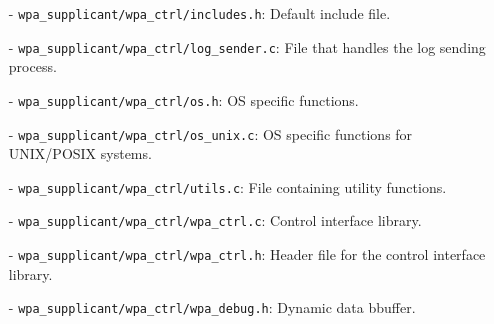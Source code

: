 \begin{itemize}
\item[-] \texttt{wpa\_supplicant/wpa\_ctrl/includes.h}: Default include file.
\item[-] \texttt{wpa\_supplicant/wpa\_ctrl/log\_sender.c}: File that handles the log sending process.
\item[-] \texttt{wpa\_supplicant/wpa\_ctrl/os.h}: OS specific functions.
\item[-] \texttt{wpa\_supplicant/wpa\_ctrl/os\_unix.c}: OS specific functions for UNIX/POSIX systems.
\item[-] \texttt{wpa\_supplicant/wpa\_ctrl/utils.c}: File containing utility functions.
\item[-] \texttt{wpa\_supplicant/wpa\_ctrl/wpa\_ctrl.c}: Control interface library.
\item[-] \texttt{wpa\_supplicant/wpa\_ctrl/wpa\_ctrl.h}: Header file for the control interface library.
\item[-] \texttt{wpa\_supplicant/wpa\_ctrl/wpa\_debug.h}: Dynamic data bbuffer.

\end{itemize}


